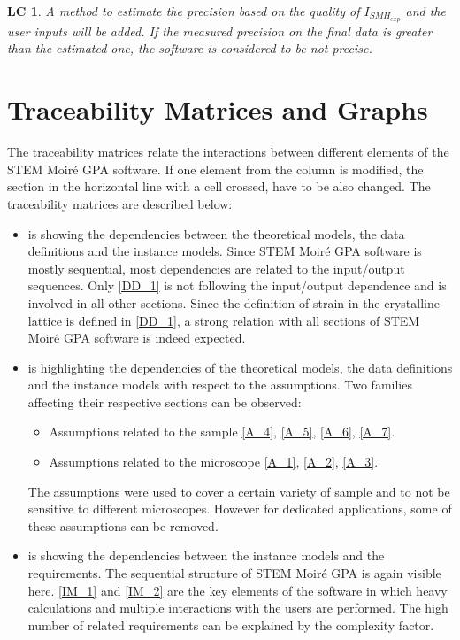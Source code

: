 \documentclass[12pt]{article}
\newcommand{\progname}{STEM Moir{\'e} GPA}
\newtheorem{LC}{LC}
\begin{document}
\begin{LC}
\label{LC_4}
\normalfont A method to estimate the precision based on the quality of $I_{SMH_{exp}}$ and the user inputs will be added. If the measured precision on the final data is greater than the estimated one, the software is considered to be not precise. 
\end{LC}

\section{Traceability Matrices and Graphs}

The traceability matrices relate the interactions between different elements of the \progname{} software. If one element from the column is modified, the section in the horizontal line with a cell crossed, have to be also changed. The traceability matrices are described below:
\begin{itemize}
\item{} is showing the dependencies between the theoretical models, the data definitions and the instance models. Since \progname{} software is mostly sequential, most dependencies are related to the input/output sequences. Only \cref{DD_1} is not following the input/output dependence and is involved in all other sections. Since the definition of strain in the crystalline lattice is defined in \cref{DD_1}, a strong relation with all sections of \progname{} software is indeed expected.
\item {} is highlighting the dependencies of the theoretical models, the data definitions and the instance models with respect to the assumptions. Two families affecting their respective sections can be observed:
\begin{itemize}
\item Assumptions related to the sample \cref{A_4}, \cref{A_5}, \cref{A_6}, \cref{A_7}. 
\item Assumptions related to the microscope \cref{A_1}, \cref{A_2}, \cref{A_3}.
\end{itemize}
The assumptions were used to cover a certain variety of sample and to not be sensitive to different microscopes. However for dedicated applications, some of these assumptions can be removed.
\item {} is showing the dependencies between the instance models and the requirements. The sequential structure of \progname{} is again visible here. \cref{IM_1} and \cref{IM_2} are the key elements of the software in which heavy calculations and multiple interactions with the users are performed. The high number of related requirements can be explained by the complexity factor.
\end{itemize}
\end{document}
